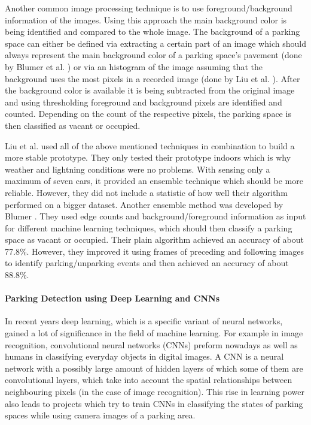Another common image processing technique is to use foreground/background information of the images. Using this approach the main background color is being identified and compared to the whole image. The background of a parking space can either be defined via extracting a certain part of an image which should always represent the main background color of a parking space's pavement (done by Blumer et al. \cite{Blumer2012}) or via an histogram of the image assuming that the background uses the most pixels in a recorded image (done by Liu et al. \cite{stationary_camera_sensing}). After the background color is available it is being subtracted from the original image and using thresholding foreground and background pixels are identified and counted. Depending on the count of the respective pixels, the parking space is then classified as vacant or occupied.

Liu et al. \cite{stationary_camera_sensing} used all of the above mentioned techniques in combination to build a more stable prototype. They only tested their prototype indoors which is why weather and lightning conditions were no problems. With sensing only a maximum of seven cars, it provided an ensemble technique which should be more reliable. However, they did not include a statistic of how well their algorithm performed on a bigger dataset. Another ensemble method was developed by Blumer \cite{Blumer2012}. They used edge counts and background/foreground information as input for different machine learning techniques, which should then classify a parking space as vacant or occupied. Their plain algorithm achieved an accuracy of about 77.8\%. However, they improved it using frames of preceding and following images to identify parking/unparking events and then achieved an accuracy of about 88.8\%.


\paragraph{Parking Detection using Deep Learning and CNNs}

In recent years deep learning, which is a specific variant of neural networks, gained a lot of significance in the field of machine learning. For example in image recognition, convolutional neural networks (CNNs) preform nowadays as well as humans in classifying everyday objects in digital images. A CNN is a neural network with a possibly large amount of hidden layers of which some of them are convolutional layers, which take into account the spatial relationships between neighbouring pixels (in the case of image recognition). This rise in learning power also leads to projects which try to train CNNs in classifying the states of parking spaces while using camera images of a parking area.

